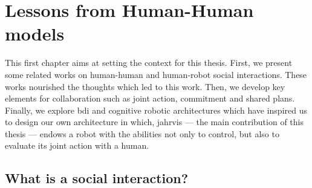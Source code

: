 \documentclass[a4paper,11pt,twoside]{StyleThese}
\begin{document}
	\setcounter{chapter}{0} %
	\dominitoc
	\faketableofcontents
	\fi


\chapter{Lessons from Human-Human models}
\label{chapter:chap1}
\minitoc

This first chapter aims at setting the context for this thesis. First, we present some related works on human-human and human-robot social interactions. These works nourished the thoughts which led to this work. Then, we develop key elements for collaboration such as joint action, commitment and shared plans. Finally, we explore \acrfull{bdi} and cognitive robotic architectures  which have inspired us to design our own architecture in which, \acrshort{jahrvis} —  the main contribution of this thesis — endows a robot with the abilities not only to control, but also to evaluate its joint action with a human. 


\section{What is a social interaction?}
\label{chap1:sec:soc_int}
\end{document}
